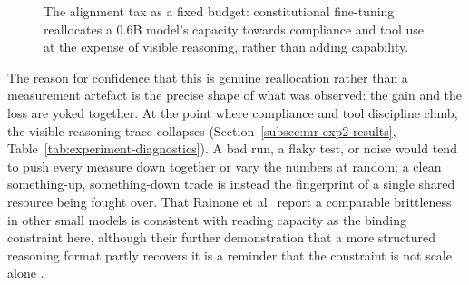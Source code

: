 \begin{figure}[H]
  \centering
  \caption{The alignment tax as a fixed budget: constitutional fine-tuning reallocates a 0.6B model's capacity towards compliance and tool use at the expense of visible reasoning, rather than adding capability.}
  \label{fig:displacement-concept}
\end{figure}

The reason for confidence that this is genuine reallocation rather than a measurement artefact is the precise shape of what was observed: the gain and the loss are yoked together. At the point where compliance and tool discipline climb, the visible reasoning trace collapses (Section~\ref{subsec:mr-exp2-results}, Table~\ref{tab:experiment-diagnostics}). A bad run, a flaky test, or noise would tend to push every measure down together or vary the numbers at random; a clean something-up, something-down trade is instead the fingerprint of a single shared resource being fought over. That Rainone et al.\ report a comparable brittleness in other small models is consistent with reading capacity as the binding constraint here, although their further demonstration that a more structured reasoning format partly recovers it is a reminder that the constraint is not scale alone \cite{rainone2025replacingthinkingtoolusage}.

